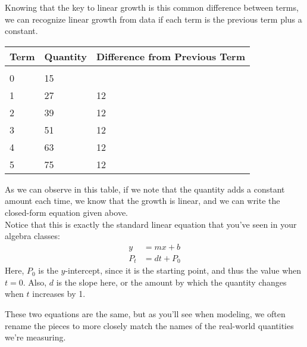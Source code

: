Knowing that the key to linear growth is this common difference between terms, we can recognize linear growth from data if each term is the previous term plus a constant.
\begin{center}
\begin{tabular}{p{0.5in} p{0.75in} p{1.25in}}
\textbf{Term} & \textbf{Quantity} & \textbf{Difference from Previous Term}\\
\hline
& & \\
0 & 15 & \\
1 & 27 & 12\\
2 & 39 & 12\\
3 & 51 & 12\\
4 & 63 & 12\\
5 & 75 & 12\\
\end{tabular}
\end{center}
As we can observe in this table, if we note that the quantity adds a constant amount each time, we know that the growth is linear, and we can write the closed-form equation given above.\\

Notice that this is exactly the standard linear equation that you've seen in your algebra classes:
\begin{align*}
y &= mx+b\\
P_t &= dt + P_0
\end{align*}
Here, $P_0$ is the $y$-intercept, since it is the starting point, and thus the value when $t=0$.  Also, $d$ is the slope here, or the amount by which the quantity changes when $t$ increases by 1.

These two equations are the same, but as you'll see when modeling, we often rename the pieces to more closely match the names of the real-world quantities we're measuring.
\pagebreak

